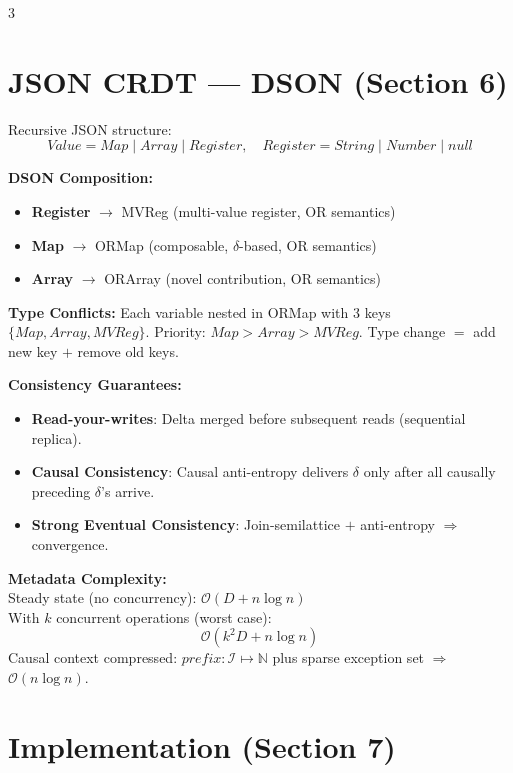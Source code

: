 \documentclass[a0,portrait]{a0poster}
\begin{document}
\begin{multicols}{3}
\section*{JSON CRDT --- DSON (Section 6)}

Recursive JSON structure:
\[
Value = Map \mid Array \mid Register, \quad Register = String \mid Number \mid null
\]

\textbf{DSON Composition:}
\begin{itemize}
  \item \textbf{Register} $\rightarrow$ MVReg (multi-value register, OR semantics)
  \item \textbf{Map} $\rightarrow$ ORMap (composable, $\delta$-based, OR semantics)
  \item \textbf{Array} $\rightarrow$ ORArray (novel contribution, OR semantics)
\end{itemize}

\textbf{Type Conflicts:} Each variable nested in ORMap with 3 keys $\{Map,Array,MVReg\}$. Priority: $Map > Array > MVReg$. Type change $=$ add new key $+$ remove old keys.

\textbf{Consistency Guarantees:}
\begin{itemize}
  \item \textbf{Read-your-writes}: Delta merged before subsequent reads (sequential replica).
  \item \textbf{Causal Consistency}: Causal anti-entropy delivers $\delta$ only after all causally preceding $\delta$'s arrive.
  \item \textbf{Strong Eventual Consistency}: Join-semilattice $+$ anti-entropy $\Rightarrow$ convergence.
\end{itemize}

\textbf{Metadata Complexity:}\\
Steady state (no concurrency): $\mathcal{O}(D + n\log n)$\\
With $k$ concurrent operations (worst case):
\[
\mathcal{O}(k^2 D + n\log n)
\]
Causal context compressed: $prefix:\mathcal{I}\mapsto\mathbb{N}$ plus sparse exception set $\Rightarrow$ $\mathcal{O}(n\log n)$.


\section*{Implementation (Section 7)}


\end{multicols}
\end{document}
